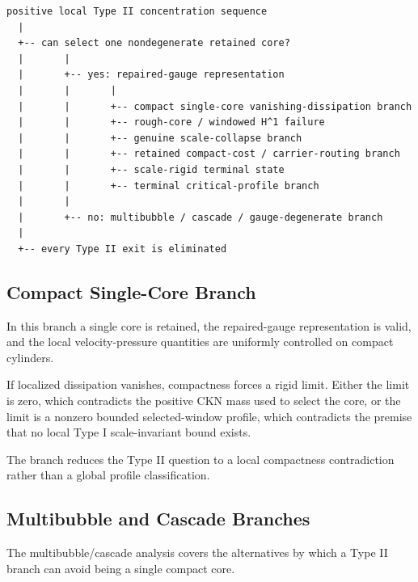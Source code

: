 \documentclass[11pt]{amsart}
\begin{document}
\begin{center}
\begin{minipage}{0.92\linewidth}
\scriptsize
\begin{verbatim}
positive local Type II concentration sequence
  |
  +-- can select one nondegenerate retained core?
  |       |
  |       +-- yes: repaired-gauge representation
  |       |       |
  |       |       +-- compact single-core vanishing-dissipation branch
  |       |       +-- rough-core / windowed H^1 failure
  |       |       +-- genuine scale-collapse branch
  |       |       +-- retained compact-cost / carrier-routing branch
  |       |       +-- scale-rigid terminal state
  |       |       +-- terminal critical-profile branch
  |       |
  |       +-- no: multibubble / cascade / gauge-degenerate branch
  |
  +-- every Type II exit is eliminated
\end{verbatim}
\end{minipage}
\end{center}

\subsection{Compact Single-Core Branch}

In this branch a single core is retained, the repaired-gauge representation is valid, and the local velocity-pressure quantities are uniformly controlled on compact cylinders.

If localized dissipation vanishes, compactness forces a rigid limit.  Either the limit is zero, which contradicts the positive CKN mass used to select the core, or the limit is a nonzero bounded selected-window profile, which contradicts the premise that no local Type I scale-invariant bound exists.

The branch reduces the Type II question to a local compactness contradiction rather than a global profile classification.

\subsection{Multibubble and Cascade Branches}

The multibubble/cascade analysis covers the alternatives by which a Type II branch can avoid being a single compact core.
\end{document}
